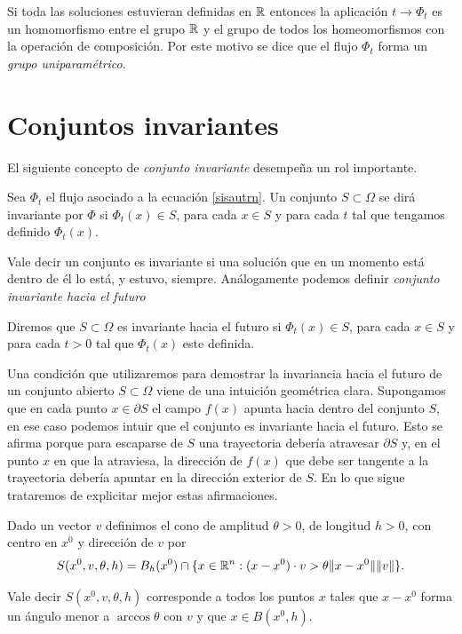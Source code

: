 Si toda las soluciones estuvieran definidas en $\rr$ entonces la
aplicación $t\to\Phi_t$ es un homomorfismo entre el grupo $\rr$ y
el grupo de todos los homeomorfismos con la operación de
composición. Por este motivo se dice que el flujo $\Phi_t$ forma
un \emph{grupo uniparamétrico}.

\section{Conjuntos invariantes}

El siguiente concepto de \emph{conjunto invariante} desempeña un
rol importante.

\begin{definicion} Sea $\Phi_t$ el flujo asociado a la ecuación
\eqref{sisautrn}. Un conjunto $S\subset\Omega$ se dirá invariante por
$\Phi$ si $\Phi_t(x)\in S$, para cada $x\in S$ y para cada $t$ tal
que tengamos definido $\Phi_t(x)$.
\end{definicion}
Vale decir un conjunto es invariante si una solución que en un
momento está dentro de él lo está, y estuvo, siempre. Análogamente
podemos definir \emph{conjunto invariante hacia el futuro}

\begin{definicion} Diremos que $S\subset \Omega$ es invariante hacia el
futuro si $\Phi_t(x)\in S$, para cada $x\in S$ y para cada $t>0$
tal que $\Phi_t(x)$ este definida.
\end{definicion}

Una condición que utilizaremos para demostrar la invariancia hacia
el futuro de un conjunto abierto $S\subset\Omega$ viene de una
intuición geométrica clara. Supongamos que en cada punto $x\in
\partial S$ el campo $f(x)$ apunta hacia dentro del conjunto $S$,
en ese caso podemos intuir que el conjunto es invariante hacia el
futuro. Esto se afirma porque para escaparse de $S$ una
trayectoria debería atravesar $\partial S$ y, en el punto $x$ en
que la atraviesa, la dirección de $f(x)$ que debe ser tangente a
la trayectoria debería apuntar en la dirección exterior de $S$. En
lo que sigue trataremos de explicitar mejor estas afirmaciones.

\begin{definicion} Dado un vector $v$ definimos el
cono de amplitud $\theta>0$, de longitud $h>0$, con
centro en $x^0$ y dirección de $v$ por
\[
    S(x^0,v,\theta,h)=B_h(x^0)\cap\{x\in\rr^n:
    (x-x^0)\cdot v> \theta \|x-x^0\|\|v\|\}.
\]
\end{definicion}
Vale decir $S(x^0,v,\theta,h)$ corresponde a todos los puntos $x$
tales que $x-x^0$ forma un ángulo menor a $\arccos\theta$ con $v$
y que $x\in B(x^0,h)$.

